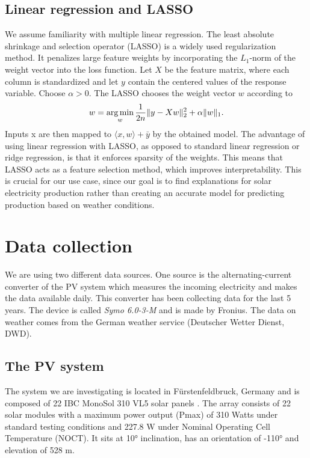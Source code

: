 \documentclass{article}
\begin{document}
\subsection{Linear regression and LASSO}
We assume familiarity with multiple linear regression. The least absolute shrinkage and selection operator (LASSO) is a widely used regularization method. It penalizes large feature weights by incorporating the $L_1$-norm of the weight vector into the loss function. Let $X$ be the feature matrix, where each column is standardized and let $y$ contain the centered values of the response variable. Choose $\alpha > 0$. The LASSO chooses the weight vector $w$ according to
\begin{equation*}
	w = \underset{w}{\text{arg\,min}} \, \frac{1}{2n} \|y - Xw\|_2^2 + \alpha \|w\|_1.
\end{equation*}
Inputs x are then mapped to $\langle x, w \rangle + \bar{y}$ by the obtained model. The advantage of using linear regression with LASSO, as
opposed to standard linear regression or ridge regression, is that it enforces sparsity of the weights. This means that LASSO acts as a feature selection method, which improves interpretability. This is crucial for our use case, since our goal is to find explanations for solar electricity production rather than creating an accurate model for predicting production based on weather conditions.


\section{Data collection}
We are using two different data sources. One source is the alternating-current converter of the PV system which measures the incoming electricity and makes the data available daily.
This converter has been collecting data for the last 5 years. The device is called \textit{Symo 6.0-3-M} and is made by Fronius.
The data on weather comes from the German weather service (Deutscher Wetter Dienst, DWD).
\subsection{The PV system}
The system we are investigating is located in Fürstenfeldbruck, Germany and is composed of 22 IBC MonoSol 310 VL5 solar panels \cite{MonoSol}.
The array consists of 22 solar modules with a maximum power output (Pmax) of 310 Watts under standard testing conditions and 227.8 W  under Nominal Operating Cell Temperature (NOCT).
It sits at 10° inclination, has an orientation of -110° and elevation of 528 m.
\end{document}
